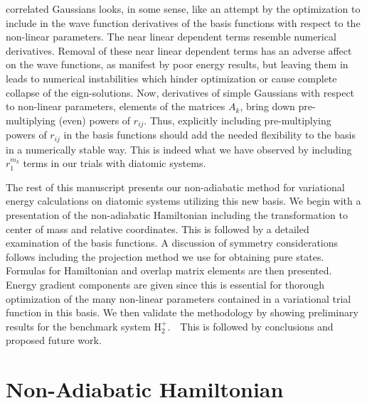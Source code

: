 \documentclass[12pt,doublespace]{article}
\begin{document}
correlated Gaussians looks, in some sense, like an attempt by the
optimization to include in the wave function derivatives of the basis
functions with respect to the non-linear parameters. The near linear
dependent terms resemble numerical derivatives. Removal of these near linear
dependent terms has an adverse affect on the wave functions, as manifest by
poor energy results, but leaving them in leads to numerical instabilities
which hinder optimization or cause complete collapse of the eign-solutions.
Now, derivatives of simple Gaussians with respect to non-linear parameters,
elements of the matrices $A_{k}$, bring down pre-multiplying (even) powers
of $r_{ij}$. Thus, explicitly including pre-multiplying powers of $r_{ij}$
in the basis functions should add the needed flexibility to the basis in a
numerically stable way. This is indeed what we have observed by including $%
r_{1}^{m_{k}}$ terms in our trials with diatomic systems.

The rest of this manuscript presents our non-adiabatic method for
variational energy calculations on diatomic systems utilizing this new
basis. We begin with a presentation of the non-adiabatic Hamiltonian
including the transformation to center of mass and relative coordinates.
This is followed by a detailed examination of the basis functions. A
discussion of symmetry considerations follows including the projection
method we use for obtaining pure states. Formulas for Hamiltonian and
overlap matrix elements are then presented. Energy gradient components are
given since this is essential for thorough optimization of the many
non-linear parameters contained in a variational trial function in this
basis. We then validate the methodology by showing preliminary results for
the benchmark system H$_{2}^{+}.$\ \ This is followed by conclusions and
proposed future work.      

\section{Non-Adiabatic Hamiltonian}
\end{document}
